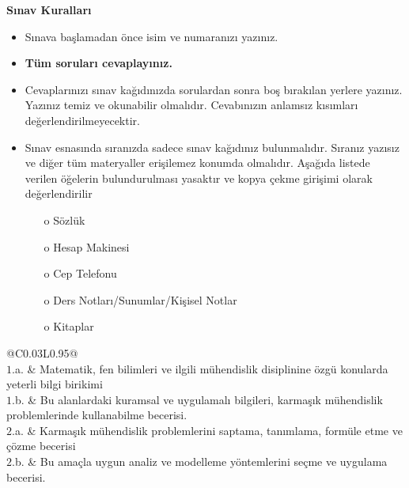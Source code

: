 \documentclass[a4paper, 11pt]{article}
\begin{document}
	\begin{center}
		\large
		\textbf{Sınav Kuralları}
	\end{center}
	\begin{itemize}
		\setlength{\itemsep}{0pt}
		\setlength{\parskip}{1pt}
		\item Sınava başlamadan önce isim ve numaranızı yazınız.
		\item \textbf{Tüm soruları cevaplayınız.} 
		\item Cevaplarınızı sınav kağıdınızda sorulardan sonra boş bırakılan yerlere yazınız. Yazınız temiz ve okunabilir olmalıdır. Cevabınızın anlamsız kısımları değerlendirilmeyecektir.
		\item Sınav esnasında sıranızda sadece sınav kağıdınız bulunmalıdır. Sıranız yazısız ve diğer tüm materyaller erişilemez konumda olmalıdır. Aşağıda listede verilen öğelerin bulundurulması yasaktır ve kopya çekme girişimi olarak değerlendirilir
		\begin{itemize}
			\setlength{\itemsep}{0pt}
			\setlength{\parskip}{1pt}
			\item[o] Sözlük
			\item[o] Hesap Makinesi
			\item[o] Cep Telefonu
			\item[o] Ders Notları/Sunumlar/Kişisel Notlar
			\item[o] Kitaplar
		\end{itemize}
	\end{itemize}
	
	\begin{table}[hb!]
		\centering
		\begin{tabular}{@{}C{0.03\linewidth}L{0.95\linewidth}@{}}
			\toprule
			 \\
			\midrule
			$1$.a. & Matematik, fen bilimleri ve ilgili mühendislik disiplinine özgü konularda yeterli bilgi birikimi \\
			$1$.b. & Bu alanlardaki kuramsal ve uygulamalı bilgileri, karmaşık mühendislik problemlerinde kullanabilme becerisi. \\
			\midrule
			$2$.a. & Karmaşık mühendislik problemlerini saptama, tanımlama, formüle etme ve çözme becerisi \\
			$2$.b. & Bu amaçla uygun analiz ve modelleme yöntemlerini seçme ve uygulama becerisi. \\
			\bottomrule
		\end{tabular}
	\end{table}
\end{document}
